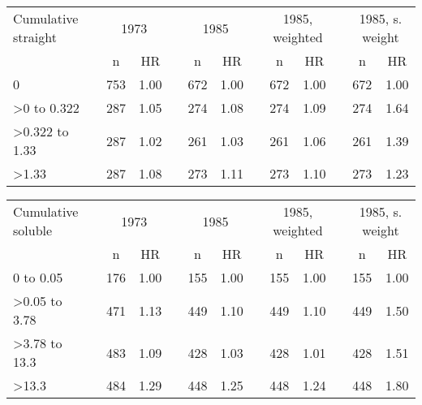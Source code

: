 \documentclass[10pt,]{article}
\begin{document}
\begin{table}[H]
\centering
\begin{tabular}{lcccccccccccc}
  \toprule
  Cumulative straight & &\multicolumn{2}{c}{1973} & &\multicolumn{2}{c}{1985} & &\multicolumn{2}{c}{1985, weighted} & &\multicolumn{2}{c}{1985, s. weight}\\
\cline{3-4}\cline{6-7}\cline{9-10}\cline{12-13}
&& n & HR&& n & HR&& n & HR&& n & HR\\ \midrule
0 &  & 753 & 1.00 &  & 672 & 1.00 &  & 672 & 1.00 &  & 672 & 1.00 \\ 
  >0 to 0.322 &  & 287 & 1.05 &  & 274 & 1.08 &  & 274 & 1.09 &  & 274 & 1.64 \\ 
  >0.322 to 1.33 &  & 287 & 1.02 &  & 261 & 1.03 &  & 261 & 1.06 &  & 261 & 1.39 \\ 
  >1.33 &  & 287 & 1.08 &  & 273 & 1.11 &  & 273 & 1.10 &  & 273 & 1.23 \\ 
   \bottomrule
\end{tabular}
\end{table}

\begin{table}[H]
\centering
\begin{tabular}{lcccccccccccc}
  \toprule
  Cumulative soluble & &\multicolumn{2}{c}{1973} & &\multicolumn{2}{c}{1985} & &\multicolumn{2}{c}{1985, weighted} & &\multicolumn{2}{c}{1985, s. weight}\\
\cline{3-4}\cline{6-7}\cline{9-10}\cline{12-13}
&& n & HR&& n & HR&& n & HR&& n & HR\\ \midrule
0 to 0.05 &  & 176 & 1.00 &  & 155 & 1.00 &  & 155 & 1.00 &  & 155 & 1.00 \\ 
  >0.05 to 3.78 &  & 471 & 1.13 &  & 449 & 1.10 &  & 449 & 1.10 &  & 449 & 1.50 \\ 
  >3.78 to 13.3 &  & 483 & 1.09 &  & 428 & 1.03 &  & 428 & 1.01 &  & 428 & 1.51 \\ 
  >13.3 &  & 484 & 1.29 &  & 448 & 1.25 &  & 448 & 1.24 &  & 448 & 1.80 \\ 
   \bottomrule
\end{tabular}
\end{table}
\end{document}
